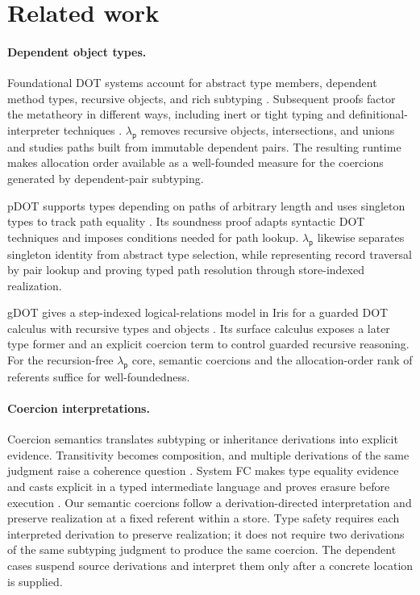 \documentclass[acmsmall,screen,nonacm]{acmart}
\newcommand{\lambdap}{\ensuremath{\lambda_{\mathsf p}}}
\begin{document}
\section{Related work}
\label{sec:related}

\paragraph{Dependent object types.}
Foundational DOT systems account for abstract type members, dependent method
types, recursive objects, and rich subtyping
\citep{amin2014foundations,rompf2016dot}. Subsequent proofs factor the
metatheory in different ways, including inert or tight typing
\citep{rapoport2017simple} and definitional-interpreter techniques
\citep{amin2017definitional}. \lambdap{} removes recursive objects,
intersections, and unions and studies paths built from immutable dependent
pairs. The resulting runtime makes allocation order available as a
well-founded measure for the coercions generated by dependent-pair subtyping.

pDOT supports types depending on paths of arbitrary length and uses singleton
types to track path equality \citep{rapoport2019pdot}. Its soundness proof
adapts syntactic DOT techniques and imposes conditions needed for path
lookup. \lambdap{} likewise separates singleton identity from abstract type
selection, while representing record traversal by pair lookup and proving
typed path resolution through store-indexed realization.

gDOT gives a step-indexed logical-relations model in Iris for a guarded DOT
calculus with recursive types and objects
\citep{giarrusso2020gdot,jung2018iris}. Its surface calculus exposes a later
type former and an explicit coercion term to control guarded recursive
reasoning. For the recursion-free \lambdap{} core, semantic coercions and the
allocation-order rank of referents suffice for well-foundedness.

\paragraph{Coercion interpretations.}
Coercion semantics translates subtyping or inheritance derivations into
explicit evidence. Transitivity becomes composition, and multiple derivations
of the same judgment raise a coherence question
\citep{breazutannen1991coercion,crary2000inclusive}. System FC makes type
equality evidence and casts explicit in a typed intermediate language and
proves erasure before execution \citep{sulzmann2007systemfc}. Our semantic
coercions follow a derivation-directed interpretation and preserve
realization at a fixed referent within a store. Type safety requires each
interpreted derivation to preserve realization; it does not require two
derivations of the same subtyping judgment to produce the same coercion. The
dependent cases suspend source derivations and interpret them only after a
concrete location is supplied.
\end{document}
